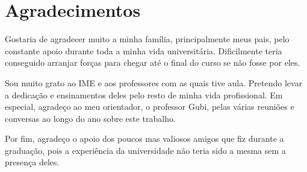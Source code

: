 \chapter*{Agradecimentos}

Gostaria de agradecer muito a minha família, principalmente meus pais, pelo constante apoio durante toda a minha vida universitária. Dificilmente teria conseguido arranjar forças para chegar até o final do curso se não fosse por eles.

Sou muito grato ao IME e aos professores com as quais tive aula. Pretendo levar a dedicação e ensinamentos deles pelo resto de minha vida profissional. Em especial, agradeço ao meu orientador, o professor Gubi, pelas várias reuniões e conversas ao longo do ano sobre este trabalho.

Por fim, agradeço o apoio dos poucos mas valiosos amigos que fiz durante a graduação, pois a experiência da universidade não teria sido a mesma sem a presença deles.
